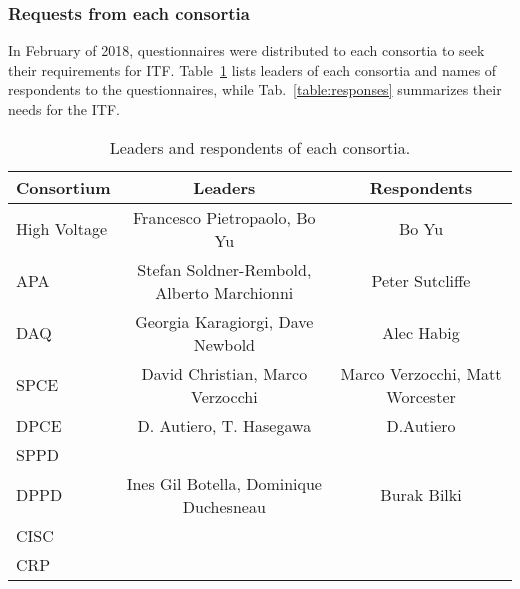 \subsubsection{\bf Requests from each consortia} 
In February of 2018, questionnaires were distributed to each consortia to seek
their requirements for ITF. Table~\ref{table:leders} lists leaders of each consortia
and names of respondents to the questionnaires, while Tab.~\ref{table:responses}
summarizes their needs for the ITF.
\begin{table}[htbp]
\caption{Leaders and respondents of each consortia.}
\label{table:leders}
\begin{center}
\begin{tabular}{|l|c|c|} \hline
{\bf Consortium} & {\bf Leaders} &{\bf Respondents} \\\hline
High Voltage & Francesco Pietropaolo, Bo Yu & Bo Yu \\ \hline
APA & Stefan Soldner-Rembold, Alberto Marchionni & Peter Sutcliffe \\ \hline
DAQ & Georgia Karagiorgi, Dave Newbold & Alec Habig \\ \hline
SPCE & David Christian, Marco Verzocchi  & Marco Verzocchi, Matt Worcester\\ \hline
DPCE & D. Autiero, T. Hasegawa &  D.Autiero  \\ \hline
SPPD & & \\ \hline
DPPD & Ines Gil Botella, Dominique Duchesneau & Burak Bilki \\ \hline
CISC & &   \\ \hline
CRP & &  \\   \hline
\end{tabular}
\end{center}
\end{table}

